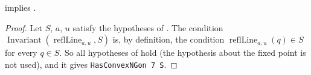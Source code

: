 \begin{lemma}\label{sr:lem:mirror-line}
 implies .
\end{lemma}

\begin{proof}
Let $S$, $a$, $u$ satisfy the hypotheses of . The condition
$\operatorname{Invariant}(\operatorname{reflLine}_{a,u},S)$ is, by definition, the condition
$\operatorname{reflLine}_{a,u}(q)\in S$ for every $q\in S$. So all hypotheses of  hold
(the hypothesis about the fixed point is not used), and it gives \texttt{HasConvexNGon 7 S}.
\end{proof}

